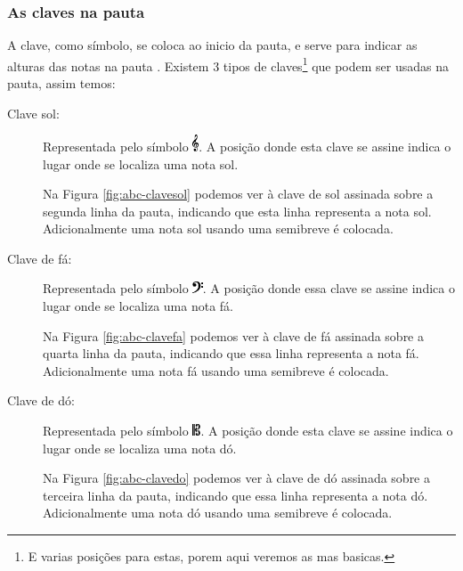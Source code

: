 \subsubsection{As claves na pauta}
\label{subsubsec:clavespauta}
A clave, como símbolo, 
se coloca ao inicio da pauta, 
e serve para indicar as alturas das notas na pauta \cite[pp. 179]{apel1969harvard} \cite[pp. 10]{cardoso1973curso}.
Existem 3 tipos de claves\footnote{E varias posições para estas, porem aqui veremos as mas basicas.} que podem ser usadas na pauta, 
assim temos: 
\begin{description}
\item [Clave sol:] Representada pelo símbolo \includegraphics[height=14pt]{chapters/cap-musica-basica/G-clef.eps}. 
A posição donde esta clave se assine indica o lugar onde se localiza uma nota sol. 
\begin{example}
Na Figura \ref{fig:abc-clavesol} podemos ver à clave de sol assinada sobre a segunda linha da pauta,
indicando que esta linha representa a nota sol.
Adicionalmente uma nota sol usando uma  semibreve é colocada.
\end{example} 
\item [Clave de fá:] Representada pelo símbolo \includegraphics[height=10pt]{chapters/cap-musica-basica/FClef.eps}. 
A posição donde essa clave se assine indica o lugar onde se localiza uma nota fá.
\begin{example}
Na Figura \ref{fig:abc-clavefa} podemos ver à clave de fá assinada sobre a quarta linha da pauta,
indicando que essa linha representa a nota fá.
Adicionalmente uma nota fá usando uma  semibreve é colocada.
\end{example} 
\item [Clave de dó:] Representada pelo símbolo \includegraphics[height=10pt]{chapters/cap-musica-basica/CClef.eps}.
A posição donde esta clave se assine indica o lugar onde se localiza uma nota dó.
\begin{example}
Na Figura \ref{fig:abc-clavedo} podemos ver à clave de dó assinada sobre a terceira linha da pauta,
indicando que essa linha representa a nota dó.
Adicionalmente uma nota dó usando uma  semibreve é colocada.
\end{example} 
\end{description}
